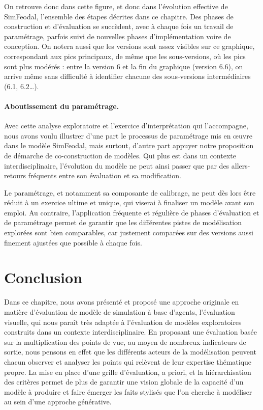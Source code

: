 On retrouve donc dans cette figure, et donc dans l'évolution effective de SimFeodal, l'ensemble des étapes décrites dans ce chapitre.
Des phases de construction et d'évaluation se succèdent, avec à chaque fois un travail de paramétrage, parfois suivi de nouvelles phases d'implémentation voire de conception.
On notera aussi que les versions sont assez visibles sur ce graphique, correspondant aux pics principaux, de même que les sous-versions, où les pics sont plus modérés : entre la version 6 et la fin du graphique (version 6.6), on arrive même sans difficulté à identifier chacune des sous-versions intermédiaires (6.1, 6.2\ldots).

\paragraph{Aboutissement du paramétrage.}

Avec cette analyse exploratoire et l'exercice d'interprétation qui l'accompagne, nous avons voulu illustrer d'une part le processus de paramétrage mis en œuvre dans le modèle SimFeodal, mais surtout, d'autre part appuyer notre proposition de démarche de co-construction de modèles.
Qui plus est dans un contexte interdisciplinaire, l'évolution du modèle ne peut ainsi passer que par des allers-retours fréquents entre son évaluation et sa modification.

Le paramétrage, et notamment sa composante de calibrage, ne peut dès lors être réduit à un exercice ultime et unique, qui viserai à \og finaliser\fg{} un modèle avant son emploi.
Au contraire, l'application fréquente et régulière de phases d'évaluation et de paramétrage permet de garantir que les différentes pistes de modélisation explorées sont bien comparables, car justement comparées sur des versions aussi finement ajustées que possible à chaque fois.

\section*{Conclusion}
\label{sec:chap3-conclu}

Dans ce chapitre, nous avons présenté et proposé une approche originale en matière d'évaluation de modèle de simulation à base d'agents, l'évaluation visuelle, qui nous paraît très adaptée à l'évaluation de modèles exploratoires construits dans un contexte interdisciplinaire.
En proposant une évaluation basée sur la multiplication des points de vue, au moyen de nombreux indicateurs de sortie, nous pensons en effet que les différents acteurs de la modélisation peuvent chacun observer et analyser les points qui relèvent de leur expertise thématique propre.
La mise en place d'une grille d'évaluation, a priori, et la hiérarchisation des critères permet de plus de garantir une vision globale de la capacité d'un modèle à produire et faire émerger les faits stylisés que l'on cherche à modéliser au sein d'une approche générative.

